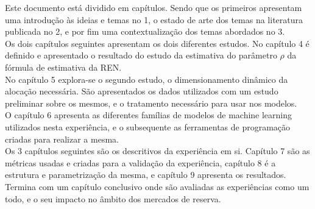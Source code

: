 Este documento está dividido em capítulos. Sendo que os primeiros apresentam uma introdução às ideias e temas no 1, o estado de arte dos temas na literatura publicada no 2, e por fim uma contextualização dos temas abordados no 3.\\
Os dois capítulos seguintes apresentam os dois diferentes estudos. No capítulo 4 é definido e apresentado o resultado do estudo da estimativa do parâmetro $\rho$ da fórmula de estimativa da REN.\\
No capítulo 5 explora-se o segundo estudo, o dimensionamento dinâmico da alocação necessária. São apresentados os dados utilizados com um estudo preliminar sobre os mesmos, e o tratamento necessário para usar nos modelos.\\
O capítulo 6 apresenta as diferentes famílias de modelos de machine learning utilizados nesta experiência, e o subsequente as ferramentas de programação criadas para realizar a mesma.\\
Os 3 capítulos seguintes são os descritivos da experiência em si. Capítulo 7 são as métricas usadas e criadas para a validação da experiência, capítulo 8 é a estrutura e parametrização da mesma, e capítulo 9 apresenta os resultados.\\
Termina com um capítulo conclusivo  onde são avaliadas as experiências como um todo, e o seu impacto no âmbito dos mercados de reserva.\\